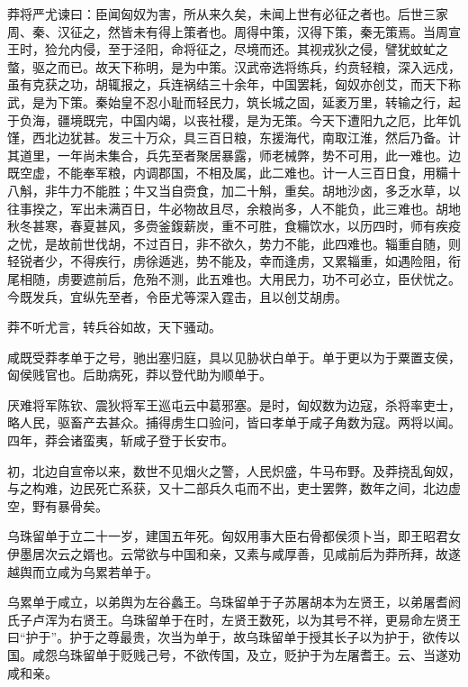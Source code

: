 \documentclass[12pt,UTF8]{ctexbook}
\begin{document}
莽将严尤谏曰：臣闻匈奴为害，所从来久矣，未闻上世有必征之者也。后世三家周、秦、汉征之，然皆未有得上策者也。周得中策，汉得下策，秦无策焉。当周宣王时，猃允内侵，至于泾阳，命将征之，尽境而还。其视戎狄之侵，譬犹蚊虻之螫，驱之而已。故天下称明，是为中策。汉武帝选将练兵，约贲轻粮，深入远戍，虽有克获之功，胡辄报之，兵连祸结三十余年，中国罢耗，匈奴亦创艾，而天下称武，是为下策。秦始皇不忍小耻而轻民力，筑长城之固，延袤万里，转输之行，起于负海，疆境既完，中国内竭，以丧社稷，是为无策。今天下遭阳九之厄，比年饥馑，西北边犹甚。发三十万众，具三百日粮，东援海代，南取江淮，然后乃备。计其道里，一年尚未集合，兵先至者聚居暴露，师老械弊，势不可用，此一难也。边既空虚，不能奉军粮，内调郡国，不相及属，此二难也。计一人三百日食，用糒十八斛，非牛力不能胜；牛又当自赍食，加二十斛，重矣。胡地沙卤，多乏水草，以往事揆之，军出未满百日，牛必物故且尽，余粮尚多，人不能负，此三难也。胡地秋冬甚寒，春夏甚风，多赍釜鍑薪炭，重不可胜，食糒饮水，以历四时，师有疾疫之忧，是故前世伐胡，不过百日，非不欲久，势力不能，此四难也。辎重自随，则轻锐者少，不得疾行，虏徐遁逃，势不能及，幸而逢虏，又累辎重，如遇险阻，衔尾相随，虏要遮前后，危殆不测，此五难也。大用民力，功不可必立，臣伏忧之。今既发兵，宜纵先至者，令臣尤等深入霆击，且以创艾胡虏。



莽不听尤言，转兵谷如故，天下骚动。



咸既受莽孝单于之号，驰出塞归庭，具以见胁状白单于。单于更以为于粟置支侯，匈侯贱官也。后助病死，莽以登代助为顺单于。



厌难将军陈钦、震狄将军王巡屯云中葛邪塞。是时，匈奴数为边寇，杀将率吏士，略人民，驱畜产去甚众。捕得虏生口验问，皆曰孝单于咸子角数为寇。两将以闻。四年，莽会诸蛮夷，斩咸子登于长安市。



初，北边自宣帝以来，数世不见烟火之警，人民炽盛，牛马布野。及莽挠乱匈奴，与之构难，边民死亡系获，又十二部兵久屯而不出，吏士罢弊，数年之间，北边虚空，野有暴骨矣。



乌珠留单于立二十一岁，建国五年死。匈奴用事大臣右骨都侯须卜当，即王昭君女伊墨居次云之婿也。云常欲与中国和亲，又素与咸厚善，见咸前后为莽所拜，故遂越舆而立咸为乌累若单于。



乌累单于咸立，以弟舆为左谷蠡王。乌珠留单于子苏屠胡本为左贤王，以弟屠耆阏氏子卢浑为右贤王。乌珠留单于在时，左贤王数死，以为其号不祥，更易命左贤王曰“护于”。护于之尊最贵，次当为单于，故乌珠留单于授其长子以为护于，欲传以国。咸怨乌珠留单于贬贱己号，不欲传国，及立，贬护于为左屠耆王。云、当遂劝咸和亲。
\end{document}
